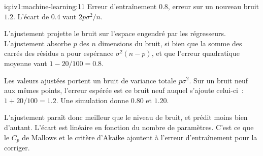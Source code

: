 \begin{solution}{iq:iv1:machine-learning:11}
Erreur d'entraînement $0.8$, erreur sur un nouveau bruit $1.2$. L'écart de $0.4$ vaut $2p\sigma^2/n$.

L'ajustement projette le bruit sur l'espace engendré par les régresseurs. L'ajustement absorbe $p$ des $n$ dimensions du bruit, si bien que la somme des carrés des résidus a pour espérance $\sigma^2(n - p)$, et que l'erreur quadratique moyenne vaut $1 - 20/100 = 0.8$.

Les valeurs ajustées portent un bruit de variance totale $p\sigma^2$. Sur un bruit neuf aux mêmes points, l'erreur espérée est ce bruit neuf auquel s'ajoute celui-ci~: $1 + 20/100 = 1.2$. Une simulation donne $0.80$ et $1.20$.

L'ajustement paraît donc meilleur que le niveau de bruit, et prédit moins bien d'autant. L'écart est linéaire en fonction du nombre de paramètres. C'est ce que le $C_p$ de Mallows et le critère d'Akaike ajoutent à l'erreur d'entraînement pour la corriger.



\end{solution}

